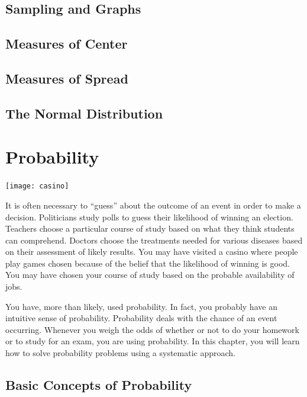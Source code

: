\documentclass[9pt,letter,twoside,openright]{memoir}
\begin{document}
\section{Sampling and Graphs}


\section{Measures of Center}


\section{Measures of Spread}


\section{The Normal Distribution}


\chapter{Probability}
\begin{center}
\texttt{[image: casino]}
\end{center}

It is often necessary to ``guess'' about the outcome of an event in order to make a decision. Politicians study polls to guess
their likelihood of winning an election. Teachers choose a particular course of study based on what they think students can
comprehend. Doctors choose the treatments needed for various diseases based on their assessment of likely results. You
may have visited a casino where people play games chosen because of the belief that the likelihood of winning is good. You
may have chosen your course of study based on the probable availability of jobs.

You have, more than likely, used probability. In fact, you probably have an intuitive sense of probability. Probability deals with the chance of an event occurring. Whenever you weigh the odds of whether or not to do your homework or to study for an exam, you are using probability. In this chapter, you will learn how to solve probability problems using a systematic approach.
\vfill
\pagebreak

\section{Basic Concepts of Probability}

\end{document}
